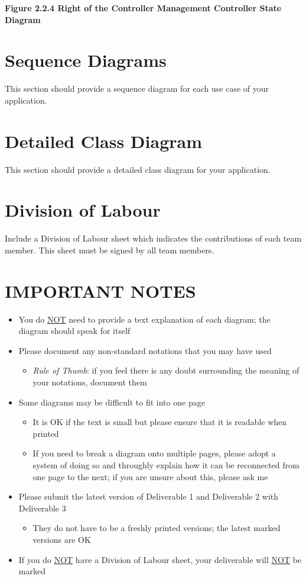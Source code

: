 \documentclass[]{article}
\begin{document}
\begin{center}
\textbf{Figure 2.2.4 Right of the Controller Management Controller State Diagram}
	
\end{center}

\section{Sequence Diagrams}
\label{sec:sequence_diagrams}
This section should provide a sequence diagram for each use case of your application.

\section{Detailed Class Diagram}
\label{sec:detailed_class_diagram}
This section should provide a detailed class diagram for your application.

\appendix
\section{Division of Labour}
\label{sec:division_of_labour}
Include a Division of Labour sheet which indicates the contributions of each team member. This sheet must be signed by all team members.

\newpage
\section*{IMPORTANT NOTES}
\begin{itemize}
	\item You do \underline{NOT} need to provide a text explanation of each diagram; the diagram should speak for itself
	\item Please document any non-standard notations that you may have used
	\begin{itemize}
		\item \emph{Rule of Thumb}: if you feel there is any doubt surrounding the meaning of your notations, document them
	\end{itemize}
	\item Some diagrams may be difficult to fit into one page
	\begin{itemize}
		\item It is OK if the text is small but please ensure that it is readable when printed
		\item If you need to break a diagram onto multiple pages, please adopt a system of doing so and throughly explain how it can be reconnected from one page to the next; if you are unsure about this, please ask me
	\end{itemize}
	\item Please submit the latest version of Deliverable 1 and Deliverable 2 with Deliverable 3
	\begin{itemize}
		\item They do not have to be a freshly printed versions; the latest marked versions are OK
	\end{itemize}
	\item If you do \underline{NOT} have a Division of Labour sheet, your deliverable will \underline{NOT} be marked
\end{itemize}
\end{document}
